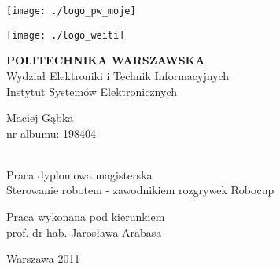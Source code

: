 \begin{titlepage}
\linespread{1.1}
\hspace{0.4cm}
 \begin{minipage}{0.4\textwidth}
	\begin{flushleft} 
	\texttt{[image: ./logo\_pw\_moje]}
	\end{flushleft}
\end{minipage}
\begin{minipage}{0.4\textwidth}
	\begin{flushright} 
	\texttt{[image: ./logo\_weiti]}
	\end{flushright}
\end{minipage}
\begin{flushleft}


\end{flushleft}
\vspace{0.1cm}
\begin{center}
{\textbf{\LARGE POLITECHNIKA WARSZAWSKA}}\\
\Large Wydział Elektroniki i Technik Informacyjnych\\
\Large Instytut Systemów Elektronicznych\\[2.5cm]
 \begin{minipage}{0.9\textwidth}
	\begin{flushleft} 
	\Large
	Maciej Gąbka\\nr albumu: 198404
	\end{flushleft}
\end{minipage}
\\[1.5cm]
{\Large Praca dyplomowa magisterska}\\
 \Huge Sterowanie robotem - zawodnikiem rozgrywek Robocup\\[2.0cm]
\begin{flushleft} \large
\hspace{5.5cm}Praca wykonana pod kierunkiem \\ 
\hspace{5.5cm}prof. dr hab. Jarosława Arabasa
\end{flushleft}
\vfill
{\large Warszawa 2011}
\end{center}
\end{titlepage}
